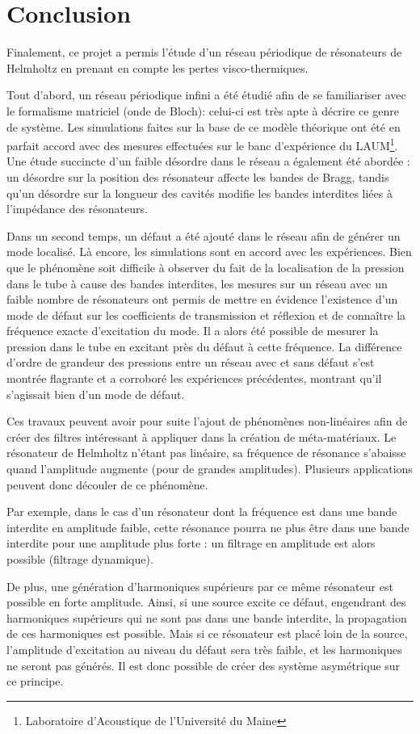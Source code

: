 \chapter{Conclusion}

Finalement, ce projet a permis l'étude d'un réseau périodique de résonateurs de Helmholtz en prenant en compte les pertes visco-thermiques. 

Tout d'abord, un réseau périodique infini a été étudié afin de se familiariser avec le formalisme matriciel (onde de Bloch): celui-ci est très apte à décrire ce genre de système. Les simulations faites sur la base de ce modèle théorique ont été en parfait accord avec des mesures effectuées sur le banc d'expérience du LAUM\footnote{\samepage Laboratoire d'Acoustique de l'Université du Maine}. Une étude succincte d'un faible désordre dans le réseau a également été abordée : un désordre sur la position des résonateur affecte les bandes de Bragg, tandis qu'un désordre sur la longueur des cavités modifie les bandes interdites liées à l'impédance des résonateurs.

 
Dans un second temps, un défaut a été ajouté dans le réseau afin de générer un mode localisé. Là encore, les simulations sont en accord avec les expériences. Bien que le phénomène soit difficile à observer du fait de la localisation de la pression dans le tube à cause des bandes interdites, les mesures sur un réseau avec un faible nombre de résonateurs ont permis de mettre en évidence l’existence d'un mode de défaut sur les coefficients de transmission et réflexion et de connaître la fréquence exacte d’excitation du mode. Il a alors été possible de mesurer la pression dans le tube en excitant près du défaut à cette fréquence. La différence d'ordre de grandeur des pressions entre un réseau avec et sans défaut s'est montrée flagrante et a corroboré les expériences précédentes, montrant qu'il s'agissait bien d'un mode de défaut.

Ces travaux peuvent avoir pour suite l'ajout de phénomènes non-linéaires afin de créer des filtres intéressant à appliquer dans la création de méta-matériaux. Le résonateur de Helmholtz n'étant pas linéaire, sa fréquence de résonance s'abaisse quand l'amplitude augmente (pour de grandes amplitudes). Plusieurs applications peuvent donc découler de ce phénomène.

Par exemple, dans le cas d'un résonateur dont la fréquence est dans une bande interdite en amplitude faible, cette résonance pourra ne plus être dans une bande interdite pour une amplitude plus forte : un filtrage en amplitude est alors possible (filtrage dynamique).


De plus, une génération d'harmoniques supérieurs par ce même résonateur est possible en forte amplitude. Ainsi, si une source excite ce défaut, engendrant des harmoniques supérieurs qui ne sont pas dans une bande interdite, la propagation de ces harmoniques est possible. Mais si ce résonateur est placé loin de la source, l'amplitude d'excitation au niveau du défaut sera très faible, et les harmoniques ne seront pas générés. Il est donc possible de créer des système asymétrique sur ce principe.







